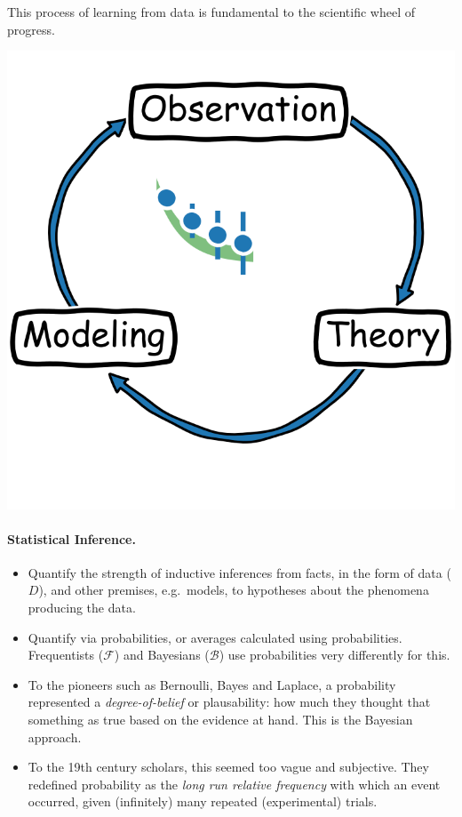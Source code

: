 \documentclass[%
oneside,                 %
final,                   %
10pt]{article}
\newenvironment{block_mdfboxadmon}[1][]{
\begin{block_mdfboxmdframed}[frametitle=#1]
}
{
\end{block_mdfboxmdframed}
}
\begin{document}
This process of learning from data is fundamental to the scientific wheel of progress.


\vspace{6mm}

\centerline{\includegraphics[width=0.4\linewidth]{fig/scientific_wheel_data.png}}

\vspace{6mm}



\paragraph{Statistical Inference.}

\begin{block_mdfboxadmon}[]
\begin{itemize}
\item Quantify the strength of inductive inferences from facts, in the form of data ($D$), and other premises, e.g.~models, to hypotheses about the phenomena producing the data.

\item Quantify via probabilities, or averages calculated using probabilities. Frequentists ($\mathcal{F}$) and Bayesians ($\mathcal{B}$) use probabilities very differently for this.

\item To the pioneers such as Bernoulli, Bayes and Laplace, a probability represented a \emph{degree-of-belief} or plausability: how much they thought that something as true based on the evidence at hand. This is the Bayesian approach.

\item To the 19th century scholars, this seemed too vague and subjective. They redefined probability as the \emph{long run relative frequency} with which an event occurred, given (infinitely) many repeated (experimental) trials.
\end{itemize}

\noindent
\end{block_mdfboxadmon} %
\end{document}
